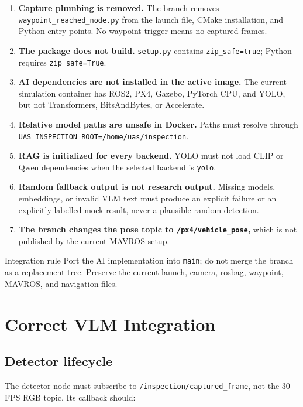 \documentclass[11pt,a4paper]{article}
\newcommand{\code}[1]{\texttt{\small #1}}
\begin{document}
\begin{enumerate}[leftmargin=1.2cm]
\item \textbf{Capture plumbing is removed.} The branch removes
\code{waypoint\_reached\_node.py} from the launch file, CMake installation,
and Python entry points. No waypoint trigger means no captured frames.
\item \textbf{The package does not build.} \code{setup.py} contains
\code{zip\_safe=true}; Python requires \code{zip\_safe=True}.
\item \textbf{AI dependencies are not installed in the active image.} The
current simulation container has ROS2, PX4, Gazebo, PyTorch CPU, and YOLO, but
not Transformers, BitsAndBytes, or Accelerate.
\item \textbf{Relative model paths are unsafe in Docker.} Paths must resolve
through \code{UAS\_INSPECTION\_ROOT=/home/uas/inspection}.
\item \textbf{RAG is initialized for every backend.} YOLO must not load CLIP
or Qwen dependencies when the selected backend is \code{yolo}.
\item \textbf{Random fallback output is not research output.} Missing models,
embeddings, or invalid VLM text must produce an explicit failure or an
explicitly labelled mock result, never a plausible random detection.
\item \textbf{The branch changes the pose topic to \code{/px4/vehicle\_pose},}
which is not published by the current MAVROS setup.
\end{enumerate}

\begin{warning}{Integration rule}
Port the AI implementation into \code{main}; do not merge the branch as a
replacement tree. Preserve the current launch, camera, rosbag, waypoint,
MAVROS, and navigation files.
\end{warning}

\section{Correct VLM Integration}

\subsection{Detector lifecycle}

The detector node must subscribe to \code{/inspection/captured\_frame}, not
the 30 FPS RGB topic. Its callback should:
\end{document}
